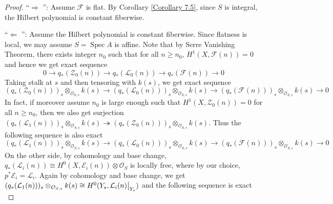\documentclass{ctexart}
\newcommand{\leftquotes}{\textquotedblleft}
\newcommand{\rightquotes}{\textquotedblright}
\newcommand{\spec}{\operatorname{Spec}}
\begin{document}
\begin{proof}
    \leftquotes $\Rightarrow$ \rightquotes : Assume $\mathcal{F}$ is flat.
    By Corollary \ref{Corollary 7.5}, since $S$ is integral, the Hilbert polynomial is constant fiberwise.
    \par
    \leftquotes $\Leftarrow$ \rightquotes : Assume the Hilbert polynomial is constant fiberwise.
    Since flatness is local, we may assume $S = \spec A$ is affine.
    Note that by Serre Vanishing Theorem, there exists integer $n_{0}$ such that for all $n \ge n_{0}$,
    $H^{1}(X, \mathcal{F}(n)) = 0$ and hence we get exact sequence
    \begin{equation}
        0 \longrightarrow q_{\ast}(\mathcal{Z}_{0}(n)) \longrightarrow q_{\ast}(\mathcal{L}_{0}(n)) \longrightarrow q_{\ast}(\mathcal{F}(n)) \longrightarrow 0
    \end{equation}
    Taking stalk at $s$ and then tensoring with $k(s)$, we get exact sequence
    \begin{equation}
        (q_{\ast}(\mathcal{Z}_{0}(n)))_{s} \otimes_{\mathcal{O}_{S, s}} k(s) \longrightarrow (q_{\ast}(\mathcal{L}_{0}(n)))_{s} \otimes_{\mathcal{O}_{S, s}} k(s) \longrightarrow (q_{\ast}(\mathcal{F}(n)))_{s} \otimes_{\mathcal{O}_{S, s}} k(s) \longrightarrow 0
    \end{equation}
    In fact, if moreover assume $n_{0}$ is large enough such that $H^{1}(X, \mathcal{Z}_{0}(n)) = 0$ for all $n \ge n_{0}$,
    then we also get surjection $(q_{\ast}(\mathcal{L}_{1}(n)))_{s} \otimes_{\mathcal{O}_{S, s}} k(s) \twoheadrightarrow (q_{\ast}(\mathcal{Z}_{0}(n)))_{s} \otimes_{\mathcal{O}_{S, s}} k(s)$.
    Thus the following sequence is also exact
    \begin{equation}
        (q_{\ast}(\mathcal{L}_{1}(n)))_{s} \otimes_{\mathcal{O}_{S, s}} k(s) \longrightarrow (q_{\ast}(\mathcal{L}_{0}(n)))_{s} \otimes_{\mathcal{O}_{S, s}} k(s) \longrightarrow (q_{\ast}(\mathcal{F}(n)))_{s} \otimes_{\mathcal{O}_{S, s}} k(s) \longrightarrow 0
    \end{equation}
    On the other side, by cohomology and base change, $q_{\ast}(\mathcal{L}_{i}(n)) \cong H^{0}(X, \mathcal{E}_{i}(n)) \otimes \mathcal{O}_{S}$ is locally free,
    where by our choice, $p^{\ast}\mathcal{E}_{i} = \mathcal{L}_{i}$.
    Again by cohomology and base change, we get $(q_{\ast}(\mathcal{L}_{1}(n)))_{s} \otimes_{\mathcal{O}_{S, s}} k(s) \cong H^{0}(Y_{s}, \mathcal{L}_{i}(n)\big{|}_{Y_{s}})$ and the following sequence is exact
    \begin{equation}

\end{equation}
\end{proof}
\end{document}
